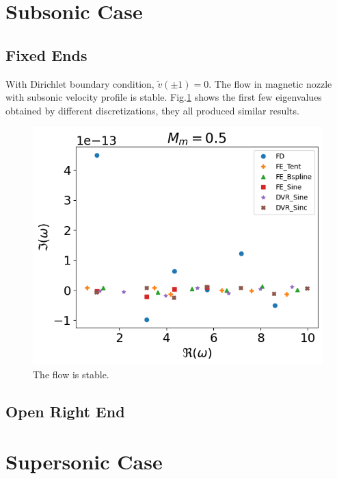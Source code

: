 \section{Subsonic Case}
\subsection{Fixed Ends}
With Dirichlet boundary condition, $\tilde{v}(\pm 1) =0$. The flow in magnetic nozzle with subsonic velocity profile is stable. Fig.\ref{fig:subsonic_v} shows the first few eigenvalues obtained by different discretizations, they all produced similar results.
\begin{figure} [H]
	\centering
	\includegraphics[width=0.7\linewidth]{img/numerical_experiments/subsonic_v}
	\caption{The flow is stable.}
	\label{fig:subsonic_v}
\end{figure}

\subsection{Open Right End}


\section{Supersonic Case}
